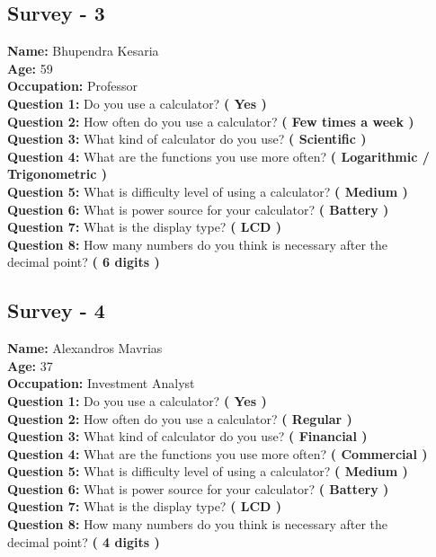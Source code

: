 \documentclass{article}
\begin{document}
\subsection{Survey - 3}
\textbf{Name: }Bhupendra Kesaria \\
\textbf{Age: } 59 \\
\textbf{Occupation: } Professor \\
\textbf{Question 1:} Do you use a calculator? \textbf{( Yes )}\\
\textbf{Question 2:} How often do you use a calculator? \textbf{( Few times a week )}\\
\textbf{Question 3:} What kind of calculator do you use? \textbf{( Scientific )}\\
\textbf{Question 4:} What are the functions you use more often? \textbf{( Logarithmic / Trigonometric )}\\
\textbf{Question 5:} What is difficulty level of using a calculator? \textbf{( Medium )}\\ 
\textbf{Question 6:} What is power source for your calculator? \textbf{(  Battery )}\\ 
\textbf{Question 7:} What is the display type? \textbf{( LCD )}\\
\textbf{Question 8:} How many numbers do you think is necessary after the \\decimal point? \textbf{( 6 digits )}
\subsection{Survey - 4}
\textbf{Name: }Alexandros Mavrias \\
\textbf{Age: } 37 \\
\textbf{Occupation: } Investment Analyst \\
\textbf{Question 1:} Do you use a calculator? \textbf{( Yes )}\\
\textbf{Question 2:} How often do you use a calculator? \textbf{( Regular )}\\
\textbf{Question 3:} What kind of calculator do you use? \textbf{( Financial )}\\
\textbf{Question 4:} What are the functions you use more often? \textbf{( Commercial )}\\
\textbf{Question 5:} What is difficulty level of using a calculator? \textbf{( Medium )}\\ 
\textbf{Question 6:} What is power source for your calculator? \textbf{(  Battery )}\\ 
\textbf{Question 7:} What is the display type? \textbf{( LCD )}\\
\textbf{Question 8:} How many numbers do you think is necessary after the \\decimal point? \textbf{( 4 digits )}
\end{document}
